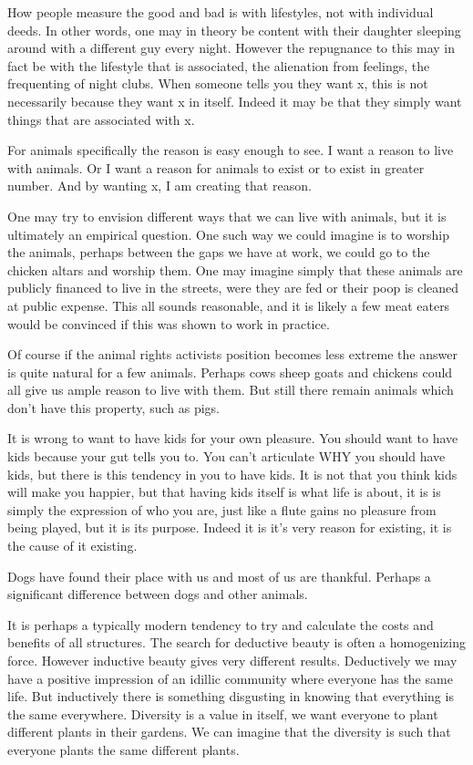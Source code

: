 \documentclass[12pt]{report}
\numberwithin{equation}{section}
\begin{document}
How people measure the good and bad is with lifestyles, not with individual deeds. In other words, one may in theory be content with their daughter sleeping around with a different guy every night. However the repugnance to this may in fact be with the lifestyle that is associated, the alienation from feelings, the frequenting of night clubs. When someone tells you they want 
 x, this is not necessarily because they want x in itself. Indeed it may be that they simply want things that are associated with x. 

For animals specifically the reason is easy enough to see. I want a reason to live with animals. Or I want a reason for animals to exist or to exist in greater number. And by wanting x, I am creating that reason. 

One may try to envision different ways that we can live with animals, but it is ultimately an empirical question. One such way we could imagine is to worship the animals, perhaps between the gaps we have at work, we could go to the chicken altars and worship them. One may imagine simply that these animals are publicly financed to live in the streets, were they are fed or their poop is cleaned at public expense. This all sounds reasonable, and it is likely a few meat eaters would be convinced if this was shown to work in practice.

Of course if the animal rights activists position becomes less extreme the answer is quite natural for a few animals. Perhaps cows sheep goats and chickens could all give us ample reason to live with them. But still there remain animals which don't have this property, such as pigs. 

It is wrong to want to have kids for your own pleasure. You should want to have kids because your gut tells you to. You can't articulate WHY you should have kids, but there is this tendency in you to have kids. It is not that you think kids will make you happier, but that having kids itself is what life is about, it is is simply the expression of who you are, just like a flute gains no pleasure from being played, but it is its purpose. Indeed it is it's very reason for existing, it is the cause of it existing. 

Dogs have found their place with us and most of us are thankful. Perhaps a significant difference between dogs and other animals. 

It is perhaps a typically modern tendency to try and calculate the costs and benefits of all structures.  The search for deductive beauty is often a homogenizing force. However inductive beauty gives very different results. Deductively we may have a positive impression of an idillic community where everyone has the same life. But inductively there is something disgusting in knowing that everything is the same everywhere. Diversity is a value in itself, we want everyone to plant different plants in their gardens. We can imagine that the diversity is such that everyone plants the same different plants. 
\end{document}
